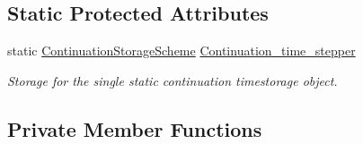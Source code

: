 \subsection*{Static Protected Attributes}
\begin{DoxyCompactItemize}
\item 
static \hyperlink{classoomph_1_1ContinuationStorageScheme}{Continuation\+Storage\+Scheme} \hyperlink{classoomph_1_1Problem_ade29c0a82218d50136b4b3860055ad30}{Continuation\+\_\+time\+\_\+stepper}
\begin{DoxyCompactList}\small\item\em Storage for the single static continuation timestorage object. \end{DoxyCompactList}\end{DoxyCompactItemize}
\subsection*{Private Member Functions}
